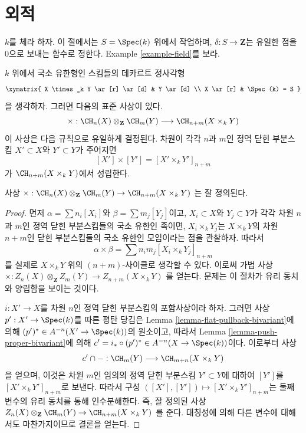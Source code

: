 \section{외적}
\label{section-exterior-product}

\noindent
$k$를 체라 하자. 이 절에서는 $S = \Spec(k)$ 위에서 작업하며,
$\delta : S \to \mathbf{Z}$는 유일한 점을 $0$으로 보내는 함수로 정한다.
Example \ref{example-field}를 보라.

\medskip\noindent
$k$ 위에서 국소 유한형인 스킴들의 데카르트 정사각형
$$
\xymatrix{
X \times_k Y \ar[r] \ar[d] & Y \ar[d] \\
X \ar[r] & \Spec(k) = S
}
$$
을 생각하자. 그러면 다음의 표준 사상이 있다.
$$
\times :
\CH_n(X) \otimes_{\mathbf{Z}} \CH_m(Y)
\longrightarrow
\CH_{n + m}(X \times_k Y)
$$
이 사상은 다음 규칙으로 유일하게 결정된다. 차원이 각각 $n$과 $m$인
정역 닫힌 부분스킴 $X' \subset X$와 $Y' \subset Y$가 주어지면
$$
[X'] \times [Y'] = [X' \times_k Y']_{n + m}
$$
가 $\CH_{n + m}(X \times_k Y)$에서 성립한다.

\begin{lemma}
\label{lemma-exterior-product-well-defined}
사상
$\times : \CH_n(X) \otimes_{\mathbf{Z}} \CH_m(Y) \to \CH_{n + m}(X \times_k Y)$
는 잘 정의된다.
\end{lemma}

\begin{proof}
먼저 $\alpha = \sum n_i[X_i]$와 $\beta = \sum m_j[Y_j]$이고,
$X_i \subset X$와 $Y_j \subset Y$가 각각 차원 $n$과 $m$인 정역 닫힌
부분스킴들의 국소 유한인 족이면, $X_i \times_k Y_j$는
$X \times_k Y$의 차원 $n + m$인 닫힌 부분스킴들의 국소 유한인
모임이라는 점을 관찰하자. 따라서
$$
\alpha \times \beta = \sum n_i m_j [X_i \times_k Y_j]_{n + m}
$$
를 실제로 $X \times_k Y$ 위의 $(n + m)$-사이클로 생각할 수 있다.
이로써 가법 사상
$\times : Z_n(X) \otimes_{\mathbf{Z}} Z_m(Y) \to Z_{n + m}(X \times_k Y)$
를 얻는다. 문제는 이 절차가 유리 동치와 양립함을 보이는 것이다.

\medskip\noindent
$i : X' \to X$를 차원 $n$인 정역 닫힌 부분스킴의 포함사상이라 하자.
그러면 사상 $p' : X' \to \Spec(k)$를 따른 평탄 당김은 Lemma
\ref{lemma-flat-pullback-bivariant}에 의해
$(p')^* \in A^{-n}(X' \to \Spec(k))$의 원소이고, 따라서 Lemma
\ref{lemma-push-proper-bivariant}에 의해
$c' = i_* \circ (p')^* \in A^{-n}(X \to \Spec(k))$이다.
이로부터 사상
$$
c' \cap - : \CH_m(Y) \longrightarrow \CH_{m + n}(X \times_k Y)
$$
을 얻으며, 이것은 차원 $m$인 임의의 정역 닫힌 부분스킴
$Y' \subset Y$에 대하여 $[Y']$를 $[X' \times_k Y']_{n + m}$로 보낸다.
따라서 구성
$([X'], [Y']) \mapsto [X' \times_k Y']_{n + m}$는 둘째 변수의 유리
동치를 통해 인수분해한다. 즉, 잘 정의된 사상
$Z_n(X) \otimes_{\mathbf{Z}} \CH_m(Y) \to \CH_{n + m}(X \times_k Y)$
를 준다. 대칭성에 의해 다른 변수에 대해서도 마찬가지이므로 결론을
얻는다.
\end{proof}

